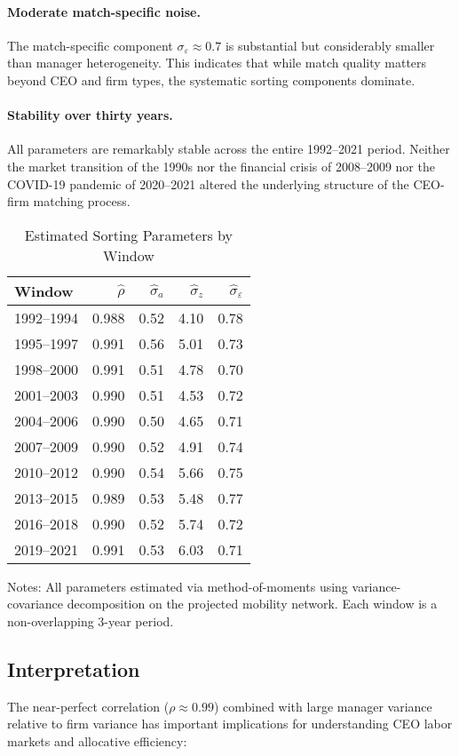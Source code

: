 \documentclass[11pt]{article}
\begin{document}
\paragraph{Moderate match-specific noise.} The match-specific component $\sigma_\varepsilon \approx 0.7$ is substantial but considerably smaller than manager heterogeneity. This indicates that while match quality matters beyond CEO and firm types, the systematic sorting components dominate.

\paragraph{Stability over thirty years.} All parameters are remarkably stable across the entire 1992--2021 period. Neither the market transition of the 1990s nor the financial crisis of 2008--2009 nor the COVID-19 pandemic of 2020--2021 altered the underlying structure of the CEO-firm matching process.

\begin{table}[t]
\centering
\caption{Estimated Sorting Parameters by Window}
\label{tab:estimates}
\begin{tabular}{lrrrr}
\toprule
Window & $\widehat\rho$ & $\widehat\sigma_a$ & $\widehat\sigma_z$ & $\widehat\sigma_\varepsilon$ \\
\midrule
1992--1994 & 0.988 & 0.52 & 4.10 & 0.78 \\
1995--1997 & 0.991 & 0.56 & 5.01 & 0.73 \\
1998--2000 & 0.991 & 0.51 & 4.78 & 0.70 \\
2001--2003 & 0.990 & 0.51 & 4.53 & 0.72 \\
2004--2006 & 0.990 & 0.50 & 4.65 & 0.71 \\
2007--2009 & 0.990 & 0.52 & 4.91 & 0.74 \\
2010--2012 & 0.990 & 0.54 & 5.66 & 0.75 \\
2013--2015 & 0.989 & 0.53 & 5.48 & 0.77 \\
2016--2018 & 0.990 & 0.52 & 5.74 & 0.72 \\
2019--2021 & 0.991 & 0.53 & 6.03 & 0.71 \\
\bottomrule
\end{tabular}
\smallskip
\footnotesize
Notes: All parameters estimated via method-of-moments using variance-covariance decomposition on the projected mobility network. Each window is a non-overlapping 3-year period.
\end{table}

\subsection{Interpretation}
The near-perfect correlation ($\rho \approx 0.99$) combined with large manager variance relative to firm variance has important implications for understanding CEO labor markets and allocative efficiency:
\end{document}
